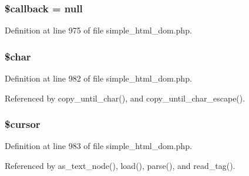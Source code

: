 \hypertarget{classsimple__html__dom_abc7c2ac0d93d22f71221e8b60512c860}{}
\subsubsection[{\$callback}]{\setlength{\rightskip}{0pt plus 5cm}\$callback = null}\label{classsimple__html__dom_abc7c2ac0d93d22f71221e8b60512c860}


Definition at line 975 of file simple\+\_\+html\+\_\+dom.\+php.

\hypertarget{classsimple__html__dom_a128242871482e787498df34c33223f14}{}
\subsubsection[{\$char}]{\setlength{\rightskip}{0pt plus 5cm}\$char\hspace{0.3cm}{\ttfamily [protected]}}\label{classsimple__html__dom_a128242871482e787498df34c33223f14}


Definition at line 982 of file simple\+\_\+html\+\_\+dom.\+php.



Referenced by copy\+\_\+until\+\_\+char(), and copy\+\_\+until\+\_\+char\+\_\+escape().

\hypertarget{classsimple__html__dom_a256b6d58b346bcd39d5bf5d49de70df2}{}
\subsubsection[{\$cursor}]{\setlength{\rightskip}{0pt plus 5cm}\$cursor\hspace{0.3cm}{\ttfamily [protected]}}\label{classsimple__html__dom_a256b6d58b346bcd39d5bf5d49de70df2}


Definition at line 983 of file simple\+\_\+html\+\_\+dom.\+php.



Referenced by as\+\_\+text\+\_\+node(), load(), parse(), and read\+\_\+tag().

\hypertarget{classsimple__html__dom_abd3661f931d84bc5e904cfd8e8e00833}{}
